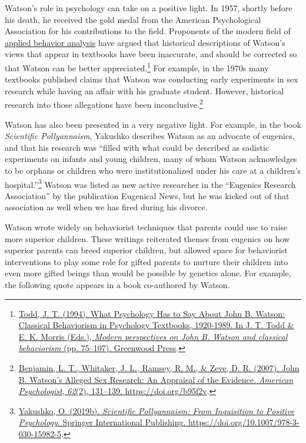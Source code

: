 \documentclass[
  oneside,
  12pt]{crumpbook}
\begin{document}
Watson's role in psychology can take on a positive light. In 1957, shortly before his death, he received the gold medal from the American Psychological Association for his contributions to the field. Proponents of the modern field of \href{https://en.wikipedia.org/wiki/Applied_behavior_analysis}{applied behavior analysis} have argued that historical descriptions of Watson's views that appear in textbooks have been inaccurate, and should be corrected so that Watson can be better appreciated.\footnote{\protect\hyperlink{ref-toddWhatPsychologyHas1994}{Todd, J. T. (1994). What {Psychology Has} to {Say About John B}. {Watson}: {Classical Behaviorism} in {Psychology Textbooks}, 1920-1989. In J. T. Todd \& E. K. Morris (Eds.), \emph{Modern perspectives on {John B}. {Watson} and classical behaviorism} (pp. 75--107). {Greenwood Press}}.} For example, in the 1970s many textbooks published claims that Watson was conducting early experiments in sex research while having an affair with his graduate student. However, historical research into those allegations have been inconclusive.\footnote{\protect\hyperlink{ref-benjaminJohnWatsonAlleged2007}{Benjamin, L. T., Whitaker, J. L., Ramsey, R. M., \& Zeve, D. R. (2007). John {B}. {Watson}'s {Alleged Sex Research}: {An Appraisal} of the {Evidence}. \emph{American Psychologist}, \emph{62}(2), 131--139. \url{https://doi.org/b95f2v}}.}

Watson has also been presented in a very negative light. For example, in the book \emph{Scientific Pollyannaism}, Yakushko describes Watson as an advocate of eugenics, and that his research was ``filled with what could be described as sadistic experiments on infants and young children, many of whom Watson acknowledges to be orphans or children who were institutionalized under his care at a children's hospital.''\footnote{\protect\hyperlink{ref-yakushkoScientificPollyannaismInquisition2019}{Yakushko, O. (2019b). \emph{Scientific {Pollyannaism}: {From Inquisition} to {Positive Psychology}}. {Springer International Publishing}. \url{https://doi.org/10.1007/978-3-030-15982-5}}.} Watson was listed as new active researcher in the ``Eugenics Research Association'' by the publication Eugenical News, but he was kicked out of that association as well when we has fired during his divorce.

Watson wrote widely on behaviorist techniques that parents could use to raise more superior children. These writings reiterated themes from eugenics on how superior parents can breed superior children, but allowed space for behaviorist interventions to play some role for gifted parents to nurture their children into even more gifted beings than would be possible by genetics alone. For example, the following quote appears in a book co-authored by Watson.
\end{document}
